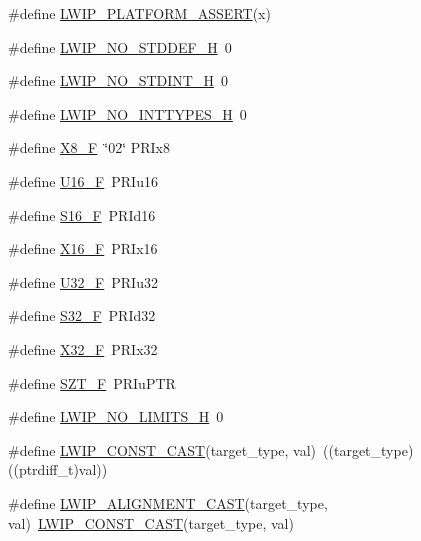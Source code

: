 \begin{DoxyCompactItemize}
\item 
\#define \hyperlink{group__compiler__abstraction_ga7e8bcd0282525704d6dd596bdd1b47d0}{L\+W\+I\+P\+\_\+\+P\+L\+A\+T\+F\+O\+R\+M\+\_\+\+A\+S\+S\+E\+RT}(x)
\item 
\#define \hyperlink{group__compiler__abstraction_ga53954d507c09e521ec0d44a2450bb89d}{L\+W\+I\+P\+\_\+\+N\+O\+\_\+\+S\+T\+D\+D\+E\+F\+\_\+H}~0
\item 
\#define \hyperlink{group__compiler__abstraction_ga122c754db96ecad23bc6f4541d6360c1}{L\+W\+I\+P\+\_\+\+N\+O\+\_\+\+S\+T\+D\+I\+N\+T\+\_\+H}~0
\item 
\#define \hyperlink{group__compiler__abstraction_ga5bf52d6f2729d0c8afd365f69d7d4373}{L\+W\+I\+P\+\_\+\+N\+O\+\_\+\+I\+N\+T\+T\+Y\+P\+E\+S\+\_\+H}~0
\item 
\#define \hyperlink{group__compiler__abstraction_ga90c130a97711a9d7e5015c610f2dfe8f}{X8\+\_\+F}~\char`\"{}02\char`\"{} P\+R\+Ix8
\item 
\#define \hyperlink{group__compiler__abstraction_gaa9d7f6eb2ee9fcc5eda3545dbb1886e0}{U16\+\_\+F}~P\+R\+Iu16
\item 
\#define \hyperlink{group__compiler__abstraction_gac05a82d37afb251470f5e17ca15ab6e9}{S16\+\_\+F}~P\+R\+Id16
\item 
\#define \hyperlink{group__compiler__abstraction_ga1418f92673e54a36b6e376109e526382}{X16\+\_\+F}~P\+R\+Ix16
\item 
\#define \hyperlink{group__compiler__abstraction_gad8b0a364e95b07cb0c47709fdc6037d6}{U32\+\_\+F}~P\+R\+Iu32
\item 
\#define \hyperlink{group__compiler__abstraction_ga4b1eca99bc81e248c7074ea87fc9ca63}{S32\+\_\+F}~P\+R\+Id32
\item 
\#define \hyperlink{group__compiler__abstraction_gac219830a93d05c5f18f64ce87a34be14}{X32\+\_\+F}~P\+R\+Ix32
\item 
\#define \hyperlink{group__compiler__abstraction_ga4cd359b6110f318ef71814587e1df029}{S\+Z\+T\+\_\+F}~P\+R\+Iu\+P\+TR
\item 
\#define \hyperlink{group__compiler__abstraction_gade9c8513419a799cd78a07ae894bb805}{L\+W\+I\+P\+\_\+\+N\+O\+\_\+\+L\+I\+M\+I\+T\+S\+\_\+H}~0
\item 
\#define \hyperlink{group__compiler__abstraction_gaa0dd3f76dd9a837feaac61fedc0dbe72}{L\+W\+I\+P\+\_\+\+C\+O\+N\+S\+T\+\_\+\+C\+A\+ST}(target\+\_\+type,  val)~((target\+\_\+type)((ptrdiff\+\_\+t)val))
\item 
\#define \hyperlink{group__compiler__abstraction_gaade87973d72135b0b3afccfff4f62eb8}{L\+W\+I\+P\+\_\+\+A\+L\+I\+G\+N\+M\+E\+N\+T\+\_\+\+C\+A\+ST}(target\+\_\+type,  val)~\hyperlink{group__compiler__abstraction_gaa0dd3f76dd9a837feaac61fedc0dbe72}{L\+W\+I\+P\+\_\+\+C\+O\+N\+S\+T\+\_\+\+C\+A\+ST}(target\+\_\+type, val)

\end{DoxyCompactItemize}
